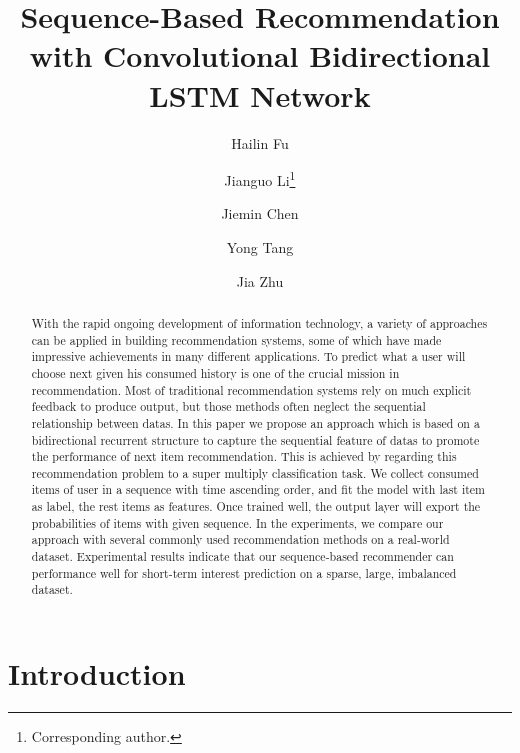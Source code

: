 \documentclass[runningheads]{llncs}
\begin{document}
%
\title{Sequence-Based Recommendation with Convolutional Bidirectional LSTM Network}
%
%
\author{Hailin Fu \and Jianguo Li\thanks{Corresponding
author.} \and Jiemin Chen \and Yong Tang \and Jia Zhu}
%
%
%
\maketitle              %
%
\begin{abstract}
With the rapid ongoing development of information technology, a variety of approaches can be applied in building recommendation systems, some of which have made impressive achievements in many different applications. To predict what a user will choose next given his consumed history is one of the crucial mission in recommendation. Most of traditional recommendation systems rely on much explicit feedback to produce output, but those methods often neglect the sequential relationship between datas. In this paper we propose an approach which is based on a bidirectional recurrent structure to capture the sequential feature of datas to promote the performance of next item recommendation. This is achieved by regarding this recommendation problem to a super multiply classification task. We collect consumed items of user in a sequence with time ascending order, and fit the model with last item as label, the rest items as features. Once trained well, the output layer will export the probabilities of items with given sequence. In the experiments, we compare our approach with several commonly used recommendation methods on a real-world dataset. Experimental results indicate that our sequence-based recommender can performance well for short-term interest prediction on a sparse, large, imbalanced dataset.

\end{abstract}
%
%
%
\section{Introduction}
\end{document}
